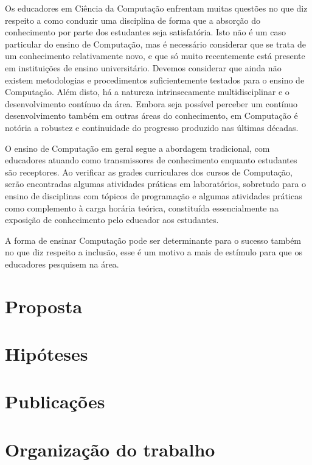 \acresetall
Os educadores em Ciência da Computação enfrentam muitas questões no que diz
respeito a como conduzir uma disciplina de forma que a absorção do conhecimento
por parte dos estudantes seja satisfatória.
Isto não é um caso particular do ensino de Computação,
mas é necessário considerar que se trata de
um conhecimento relativamente novo, e que só muito
recentemente está presente em instituições de ensino universitário.
Devemos considerar que ainda não existem metodologias e procedimentos
suficientemente testados para o ensino de Computação.
Além disto, há a natureza intrinsecamente multidisciplinar e
o desenvolvimento contínuo da área.
Embora seja possível perceber um contínuo desenvolvimento também em
outras áreas do conhecimento, em Computação é notória a robustez e
continuidade do progresso produzido nas últimas décadas.

O ensino de Computação em geral segue a abordagem tradicional,
com educadores atuando como transmissores de conhecimento
enquanto estudantes são receptores.
Ao verificar as grades curriculares dos cursos de Computação,
serão encontradas algumas atividades práticas em laboratórios,
sobretudo para o ensino de disciplinas com tópicos de programação e
algumas atividades práticas como complemento à carga horária teórica,
constituída essencialmente na exposição de conhecimento pelo educador
aos estudantes.

A forma de ensinar Computação pode ser determinante
para o sucesso também no que diz respeito a
inclusão, esse é um motivo a mais de estímulo para
que os educadores pesquisem na área.

\section{Proposta}
\section{Hipóteses}
\section{Publicações}
\section{Organização do trabalho}
